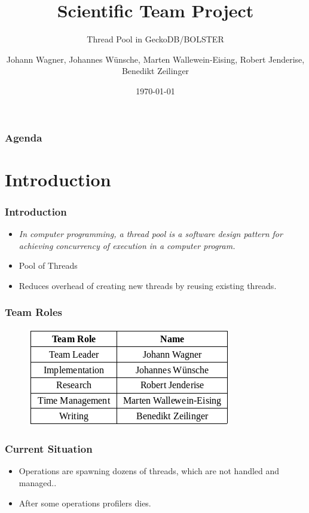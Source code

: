 \documentclass{beamer}
\title{Scientific Team Project}
\subtitle{Thread Pool in GeckoDB/BOLSTER}
\author{Johann Wagner, Johannes Wünsche, Marten Wallewein-Eising, Robert Jenderise, Benedikt Zeilinger}
\date{\today}
\institute{Otto von Guericke University, Magdeburg}
\begin{document}
\begin{frame}[plain]
 \titlepage
\end{frame}



\section[Agenda]{}
	\begin{frame}
	\frametitle{Agenda}
	\tableofcontents
	\end{frame}

\section{Introduction}
	\begin{frame}
		\frametitle{Introduction}
		\begin{itemize}
			\item \emph{In computer programming, a thread pool is a software design pattern for achieving concurrency of execution in a computer program.}
			\item Pool of Threads
			\item Reduces overhead of creating new threads by reusing existing threads.
		\end{itemize}
	\end{frame}
	
	\begin{frame}
		\frametitle{Team Roles}
		\begin{figure}
			\centering
			\includegraphics[width=0.7\linewidth]{img/TeamRoles}
			\caption{}
			\label{fig:teamroles}
		\end{figure}
	\end{frame}
	
	\begin{frame}
		\frametitle{Current Situation}
		\begin{itemize}
			\item Operations are spawning dozens of threads, which are not handled and managed..
			\item After some operations profilers dies.
		\end{itemize}
	\end{frame}
\end{document}
